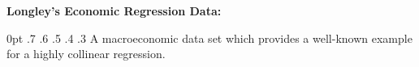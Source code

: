 \documentclass{standalone}
\begin{document}
\fontsize{14}{16}\selectfont
\begin{minipage}{3in}
{\bf Longley's Economic Regression Data:}

0pt .7\textwidth
0pt .6\textwidth
0pt .5\textwidth
0pt .4\textwidth
0pt .3\textwidth
A macroeconomic data set which provides a well-known example for a
highly collinear regression.

\end{minipage}
\end{document}
